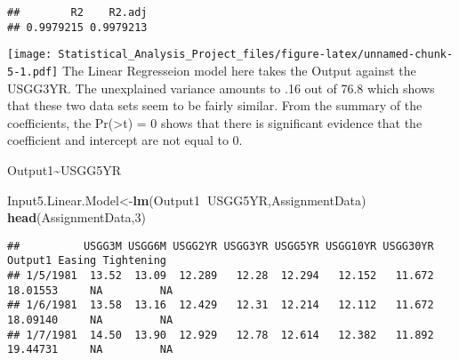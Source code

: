 \documentclass[]{article}
\newenvironment{Shaded}{\begin{snugshade}}{\end{snugshade}}
\newcommand{\KeywordTok}[1]{\textcolor[rgb]{0.13,0.29,0.53}{\textbf{#1}}}
\newcommand{\DataTypeTok}[1]{\textcolor[rgb]{0.13,0.29,0.53}{#1}}
\newcommand{\DecValTok}[1]{\textcolor[rgb]{0.00,0.00,0.81}{#1}}
\newcommand{\StringTok}[1]{\textcolor[rgb]{0.31,0.60,0.02}{#1}}
\newcommand{\OperatorTok}[1]{\textcolor[rgb]{0.81,0.36,0.00}{\textbf{#1}}}
\newcommand{\NormalTok}[1]{#1}
\begin{document}
\begin{verbatim}
##        R2    R2.adj 
## 0.9979215 0.9979213
\end{verbatim}

\begin{Shaded}
\end{Shaded}

\texttt{[image: Statistical\_Analysis\_Project\_files/figure-latex/unnamed-chunk-5-1.pdf]}
The Linear Regresseion model here takes the Output against the USGG3YR.
The unexplained variance amounts to .16 out of 76.8 which shows that
these two data sets seem to be fairly similar. From the summary of the
coefficients, the Pr(\textgreater{}t) = 0 shows that there is
significant evidence that the coefficient and intercept are not equal to
0.

Output1\textasciitilde{}USGG5YR

\begin{Shaded}
\begin{Highlighting}[]
\NormalTok{Input5.Linear.Model<-}\KeywordTok{lm}\NormalTok{(Output1}\OperatorTok{~}\NormalTok{USGG5YR,AssignmentData)}
\KeywordTok{head}\NormalTok{(AssignmentData,}\DecValTok{3}\NormalTok{)}
\end{Highlighting}
\end{Shaded}

\begin{verbatim}
##          USGG3M USGG6M USGG2YR USGG3YR USGG5YR USGG10YR USGG30YR  Output1 Easing Tightening
## 1/5/1981  13.52  13.09  12.289   12.28  12.294   12.152   11.672 18.01553     NA         NA
## 1/6/1981  13.58  13.16  12.429   12.31  12.214   12.112   11.672 18.09140     NA         NA
## 1/7/1981  14.50  13.90  12.929   12.78  12.614   12.382   11.892 19.44731     NA         NA
\end{verbatim}

\begin{Shaded}
\end{Shaded}
\end{document}
